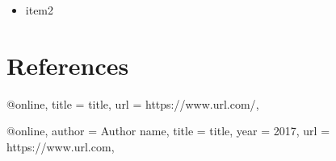 \documentclass[letterpaper,11pt]{article}
\begin{document}
\begin{multicols*}{2}
\begin{itemize}
\item item2

\end{itemize}

\section*{References}

\begin{thebibliography}{a}


\bibitem @online{,
title = {title},
url = {https://www.url.com/},
}

\bibitem @online{,
author = {Author name},
title = {title},
year = {2017},
url = {https://www.url.com},
}


\end{thebibliography}



\end{multicols*}
\end{document}
